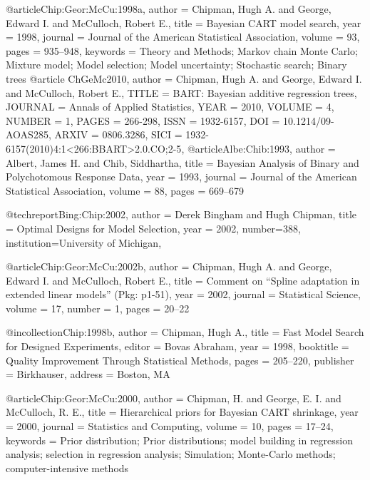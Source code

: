 @article{Chip:Geor:McCu:1998a,
    author = {Chipman, Hugh A. and George, Edward I. and McCulloch, Robert E.},
    title = {Bayesian {CART} model search},
    year = {1998},
    journal = {Journal of the American Statistical Association},
    volume = {93},
    pages = {935--948},
    keywords = {Theory and Methods; Markov chain Monte Carlo; Mixture model; Model selection; Model uncertainty; Stochastic search; Binary trees}
}
@article {ChGeMc2010,
    author = {Chipman, Hugh A. and George, Edward I. and McCulloch, Robert E.},
     TITLE = {{BART}: Bayesian additive regression trees},
  JOURNAL = {Annals of Applied Statistics},
      YEAR = {2010},
    VOLUME = {4},
    NUMBER = {1},
     PAGES = {266-298},
      ISSN = {1932-6157},
       DOI = {10.1214/09-AOAS285},
     ARXIV = {0806.3286},
      SICI = {1932-6157(2010)4:1<266:BBART>2.0.CO;2-5},
}
@article{Albe:Chib:1993,
    author = {Albert, James H. and Chib, Siddhartha},
    title = {Bayesian Analysis of Binary and Polychotomous Response Data},
    year = {1993},
    journal = {Journal of the American Statistical Association},
    volume = {88},
    pages = {669--679}
}

@techreport{Bing:Chip:2002,
    author = {Derek Bingham and Hugh Chipman},
    title = {Optimal Designs for Model Selection},
    year = 2002,
    number=388,
    institution={University of Michigan},
}

@article{Chip:Geor:McCu:2002b,
    author = {Chipman, Hugh A. and George, Edward I. and McCulloch, Robert E.},
    title = {Comment on ``{S}pline adaptation in extended linear models'' ({P}kg: p1-51)},
    year = {2002},
    journal = {Statistical Science},
    volume = {17},
    number = {1},
    pages = {20--22}
}


@incollection{Chip:1998b,
    author = {Chipman, Hugh A.},
    title = {Fast Model Search for Designed Experiments},
    editor = {Bovas Abraham},
    year = {1998},
    booktitle = {Quality Improvement Through Statistical Methods},
    pages = {205--220},
    publisher = {Birkhauser},
    address = {Boston, MA}
}

@article{Chip:Geor:McCu:2000,
    author = {Chipman, H. and George, E. I. and McCulloch, R. E.},
    title = {Hierarchical priors for {B}ayesian {CART} shrinkage},
    year = {2000},
    journal = {Statistics and Computing},
    volume = {10},
    pages = {17--24},
    keywords = {Prior distribution; Prior distributions; model building in regression analysis; selection in regression analysis; Simulation; Monte-Carlo methods; computer-intensive methods}
}

